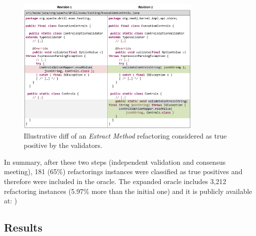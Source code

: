 \begin{figure}[htb]
\centering
\includegraphics[width=0.8\textwidth]{img/diff3.pdf}
\caption{Illustrative diff of an \emph{Extract Method} refactoring considered as true positive by the validators.}
\label{FigDiff3}
\end{figure}

In summary, after these two steps (independent validation and consensus meeting), 181 (65\%) refactorings instances were classified as true positives and therefore were included in the oracle. The expanded oracle includes 3,212 refactoring instances (5.97\% more than the initial one) and it is publicly available at: )

\subsection{Results}
\label{sec:eval:java:results}

